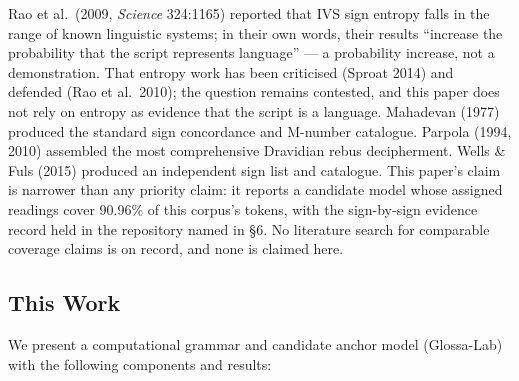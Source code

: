 \documentclass[11pt]{article}
\newcounter{none} %
\begin{document}
Rao et al.~(2009, \emph{Science} 324:1165) reported that IVS sign entropy falls in the range of known linguistic systems; in their own words, their results ``increase the probability that the script represents language'' --- a probability increase, not a demonstration. That entropy work has been criticised (Sproat 2014) and defended (Rao et al.~2010); the question remains contested, and this paper does not rely on entropy as evidence that the script is a language.
Mahadevan (1977) produced the standard sign concordance and M-number
catalogue. Parpola (1994, 2010) assembled the most comprehensive
Dravidian rebus decipherment. Wells \& Fuls (2015) produced an independent sign
list and catalogue. This paper's claim is narrower than any priority claim: it reports a candidate model whose assigned readings cover 90.96\% of this corpus's tokens, with the sign-by-sign evidence record held in the repository named in §6. No literature search for comparable coverage claims is on record, and none is claimed here.

\subsection{This Work}\label{this-work}

We present a computational grammar and candidate anchor model (Glossa-Lab) with the following components and results:
\end{document}
